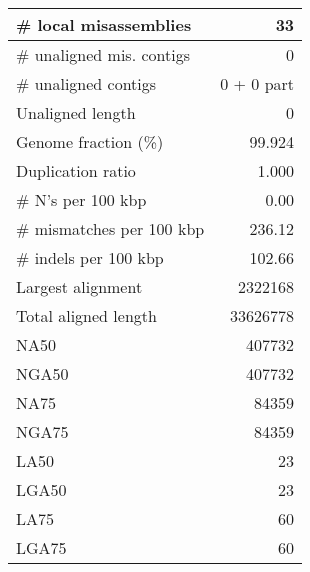 \documentclass[12pt,a4paper]{article}
\begin{document}
\begin{table}[ht]
\begin{center}
\begin{tabular}{|l*{1}{|r}|}
\# local misassemblies & 33 \\ \hline
\# unaligned mis. contigs & 0 \\ \hline
\# unaligned contigs & 0 + 0 part \\ \hline
Unaligned length & 0 \\ \hline
Genome fraction (\%) & 99.924 \\ \hline
Duplication ratio & 1.000 \\ \hline
\# N's per 100 kbp & 0.00 \\ \hline
\# mismatches per 100 kbp & 236.12 \\ \hline
\# indels per 100 kbp & 102.66 \\ \hline
Largest alignment & 2322168 \\ \hline
Total aligned length & 33626778 \\ \hline
NA50 & 407732 \\ \hline
NGA50 & 407732 \\ \hline
NA75 & 84359 \\ \hline
NGA75 & 84359 \\ \hline
LA50 & 23 \\ \hline
LGA50 & 23 \\ \hline
LA75 & 60 \\ \hline
LGA75 & 60 \\ \hline
\end{tabular}
\end{center}
\end{table}
\end{document}

